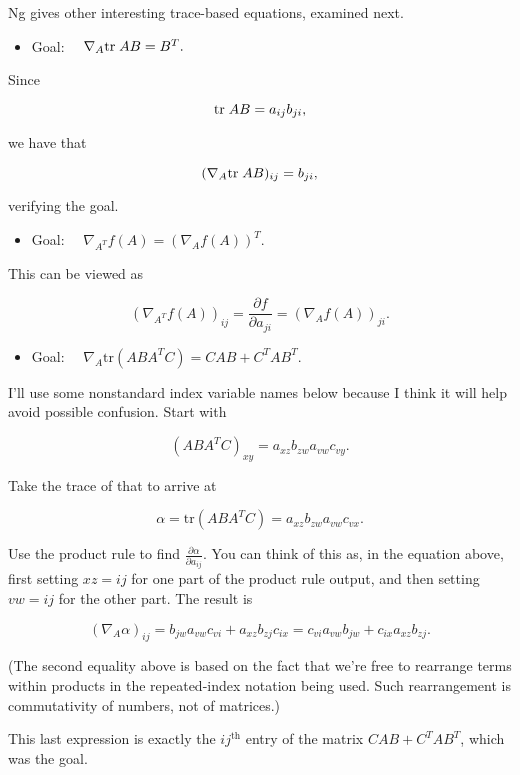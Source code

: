 \documentclass[]{article}
\providecommand{\tightlist}{%
  \setlength{\itemsep}{0pt}\setlength{\parskip}{0pt}}
\begin{document}
Ng gives other interesting trace-based equations, examined next.

\begin{itemize}
\tightlist
\item
  Goal: \(\quad \nabla_A\text{tr}\; AB = B^T.\)
\end{itemize}

Since

\[\text{tr}\; AB = a_{ij}b_{ji},\]

we have that

\[(\nabla_A\text{tr}\; AB)_{ij} = b_{ji},\]

verifying the goal.

\begin{itemize}
\tightlist
\item
  Goal: \(\quad \nabla_{A^T}f(A) = (\nabla_A f(A))^T.\)
\end{itemize}

This can be viewed as

\[(\nabla_{A^T}f(A))_{ij} = \frac{\partial f}{\partial a_{ji}}
                          = (\nabla_A f(A))_{ji}.\]

\begin{itemize}
\tightlist
\item
  Goal: \(\quad \nabla_A\text{tr}(ABA^TC) = CAB + C^TAB^T.\)
\end{itemize}

I'll use some nonstandard index variable names below because I think it
will help avoid possible confusion. Start with

\[(ABA^TC)_{xy} = a_{xz} b_{zw} a_{vw} c_{vy}.\]

Take the trace of that to arrive at

\[\alpha = \text{tr}(ABA^TC) = a_{xz} b_{zw} a_{vw} c_{vx}.\]

Use the product rule to find \(\frac{\partial\alpha}{\partial a_{ij}}\).
You can think of this as, in the equation above, first setting
\(xz = ij\) for one part of the product rule output, and then setting
\(vw = ij\) for the other part. The result is

\[(\nabla_A\alpha)_{ij} = b_{jw} a_{vw} c_{vi} + a_{xz} b_{zj} c_{ix}
                        = c_{vi} a_{vw} b_{jw} + c_{ix} a_{xz} b_{zj}.\]

(The second equality above is based on the fact that we're free to
rearrange terms within products in the repeated-index notation being
used. Such rearrangement is commutativity of numbers, not of matrices.)

This last expression is exactly the \(ij^\text{th}\) entry of the matrix
\(CAB + C^TAB^T\), which was the goal.

\hypertarget{refs}{}
\end{document}
